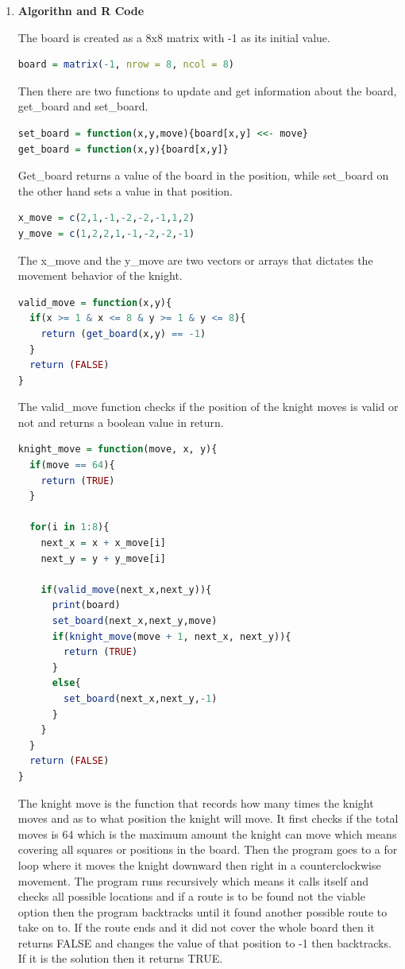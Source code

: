 \documentclass[12pt,letterpaper]{article}
\begin{document}
\begin{enumerate}[label=\Alph*]

\item \textbf{Algorithn and R Code}

The board is created as a 8x8 matrix with -1 as its initial value. 
\begin{lstlisting}[language=R]
board = matrix(-1, nrow = 8, ncol = 8)
\end{lstlisting}

Then there are two functions to update and get information about the board, get\_board and set\_board.
\begin{lstlisting}[language=R]
set_board = function(x,y,move){board[x,y] <<- move}
get_board = function(x,y){board[x,y]}
\end{lstlisting}

Get\_board returns a value of the board in the position, while set\_board on the other hand sets a value in that position.
\begin{lstlisting}[language=R]
x_move = c(2,1,-1,-2,-2,-1,1,2)
y_move = c(1,2,2,1,-1,-2,-2,-1)
\end{lstlisting}

The x\_move and the y\_move are two vectors or arrays that dictates the movement behavior of the knight.
\begin{lstlisting}[language=R]
valid_move = function(x,y){
  if(x >= 1 & x <= 8 & y >= 1 & y <= 8){
    return (get_board(x,y) == -1)
  }
  return (FALSE)
}
\end{lstlisting}

The valid\_move function checks if the position of the knight moves is valid or not and returns a boolean value in return.
\begin{lstlisting}[language=R]
knight_move = function(move, x, y){
  if(move == 64){
    return (TRUE)
  }
  
  for(i in 1:8){
    next_x = x + x_move[i]
    next_y = y + y_move[i]
    
    if(valid_move(next_x,next_y)){
      print(board)
      set_board(next_x,next_y,move)
      if(knight_move(move + 1, next_x, next_y)){
        return (TRUE)
      }
      else{
        set_board(next_x,next_y,-1)
      }
    }
  }
  return (FALSE)
}
\end{lstlisting}

The knight move is the function that records how many times the knight moves and as to what position the knight will move. It first checks if the total moves is 64 which is the maximum amount the knight can move which means covering all squares or positions in the board. Then the program goes to a for loop where it moves the knight downward then right in a counterclockwise movement. The program runs recursively which means it calls itself and checks all possible locations and if a route is to be found not the viable option then the program backtracks until it found another possible route to take on to. If the route ends and it did not cover the whole board then it returns FALSE and changes the value of that position to -1 then backtracks. If it is the solution then it returns TRUE.


\end{enumerate}
\end{document}
